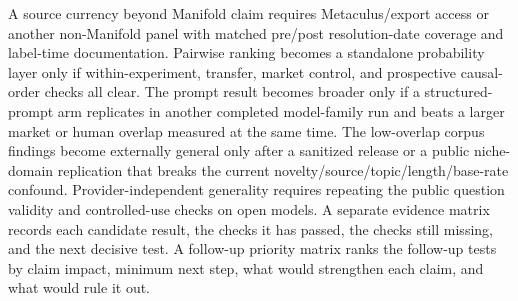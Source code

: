 \documentclass[11pt]{article}
\begin{document}
A source currency beyond Manifold claim requires Metaculus/export access or another non-Manifold panel with matched pre/post resolution-date coverage and label-time documentation. Pairwise ranking becomes a standalone probability layer only if within-experiment, transfer, market control, and prospective causal-order checks all clear. The prompt result becomes broader only if a structured-prompt arm replicates in another completed model-family run and beats a larger market or human overlap measured at the same time. The low-overlap corpus findings become externally general only after a sanitized release or a public niche-domain replication that breaks the current novelty/source/topic/length/base-rate confound. Provider-independent generality requires repeating the public question validity and controlled-use checks on open models. A separate evidence matrix records each candidate result, the checks it has passed, the checks still missing, and the next decisive test. A follow-up priority matrix ranks the follow-up tests by claim impact, minimum next step, what would strengthen each claim, and what would rule it out.
\end{document}
